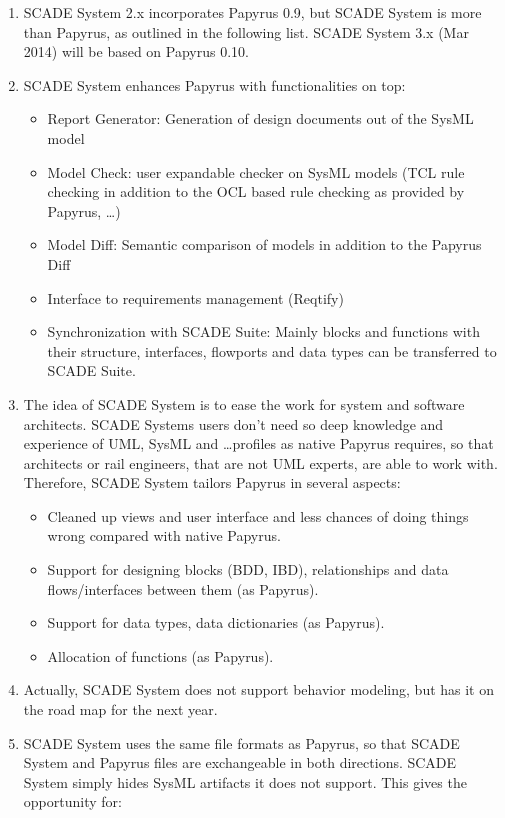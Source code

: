 \begin{enumerate}
	\item SCADE System 2.x incorporates Papyrus 0.9, but SCADE System is more than Papyrus, as outlined in the following list. SCADE System 3.x (Mar 2014) will be based on Papyrus 0.10.
	
	\item SCADE System enhances Papyrus with functionalities on top: 
	
	\begin{itemize}
		\item Report Generator: Generation of design documents out of the SysML model
		\item Model Check: user expandable checker on SysML models (TCL rule checking in addition to the OCL based rule checking as provided by Papyrus, …)
		\item Model Diff: Semantic comparison of models in addition to the Papyrus Diff
		\item Interface to requirements management (Reqtify)
		\item Synchronization with SCADE Suite: Mainly blocks and functions with their structure, interfaces, flowports and data types can be transferred to SCADE Suite.   
	\end{itemize}
	
	\item The idea of SCADE System is to ease the work for system and software architects.  SCADE Systems users don’t need so deep knowledge and experience of UML, SysML and …profiles as native Papyrus requires, so that architects or rail engineers, that are not UML experts, are able to work with. Therefore, SCADE System tailors Papyrus in several aspects:
	
	\begin{itemize}
		\item Cleaned up views and user interface and less chances of doing things wrong compared with native Papyrus.
		\item Support for designing blocks (BDD, IBD), relationships and data flows/interfaces between them (as Papyrus).
		\item Support for data types, data dictionaries (as Papyrus).
		\item Allocation of functions (as Papyrus).
	\end{itemize}
	
	\item Actually, SCADE System does not support behavior modeling, but has it on the road map for the next year.
	\item SCADE System uses the same file formats as Papyrus, so that SCADE System and Papyrus files are exchangeable in both directions. SCADE System simply hides SysML artifacts it does not support. This gives the opportunity for:
	

\end{enumerate}
